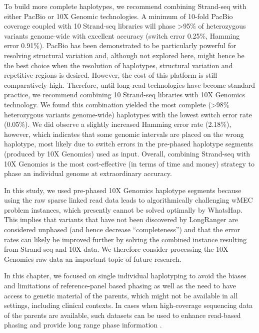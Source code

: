 	To build more complete haplotypes, we recommend combining Strand-seq with either PacBio or 10X Genomic technologies. A minimum of 10-fold PacBio coverage coupled with 10 Strand-seq 
	libraries will phase >95\% of heterozygous variants genome-wide with excellent accuracy (switch error 0.25\%, Hamming error 0.91\%). 
	PacBio has been demonstrated to be particularly powerful for resolving structural variation \citep{huddleston2017discovery, chaisson2015genetic} and, 
	although not explored here, might hence be the best choice when the resolution of haplotypes, structural variation and repetitive regions is desired. 
	However, the cost of this platform is still comparatively high. Therefore, until long-read technologies have become standard practice, we recommend combining 10 Strand-seq 
	libraries with 10X Genomics technology. We found this combination yielded the most complete (>98\% heterozygous variants genome-wide) haplotypes with the lowest switch error rate (0.05\%). 
	We did observe a slightly increased Hamming error rate (2.18\%), however, which indicates that some genomic intervals are placed on the wrong haplotype, most likely due to switch errors 
	in the pre-phased haplotype segments (produced by 10X Genomics) used as input. Overall, combining Strand-seq with 10X Genomics is the most cost-effective (in terms of time and money) strategy to phase an individual genome at extraordinary accuracy.

	
	In this study, we used pre-phased 10X Genomics haplotype segments because using the raw sparse linked read data leads to algorithmically challenging wMEC problem instances, 
	which presently cannot be solved optimally by WhatsHap. This implies that variants that have not been discovered by LongRanger are considered unphased (and hence decrease “completeness”) 
	and that the error rates can likely be improved further by solving the combined instance resulting from Strand-seq and 10X data. We therefore consider processing the 10X Genomics raw data an important topic of future research.

	In this chapter, we focused on single individual haplotyping to avoid the biases and limitations of reference-panel based phasing as well as the need to have access to genetic material of the parents, 
	which might not be available in all settings, including clinical contexts. In cases when high-coverage sequencing data of the parents are available, such datasets can be used to enhance read-based phasing and provide long range 
	phase information \citep{garg2016read}. 
	
